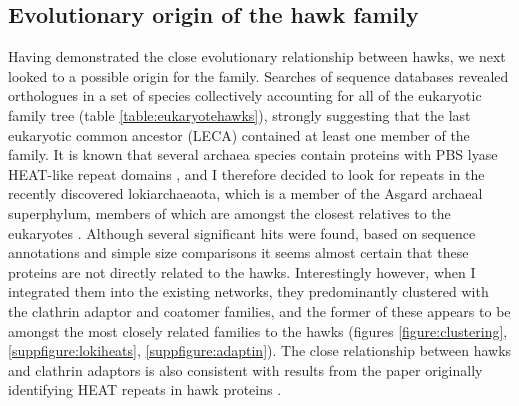 \documentclass[a4paper,11pt,twoside,openright]{scrbook}
\begin{document}
\subsection{Evolutionary origin of the hawk family}
Having demonstrated the close evolutionary relationship between hawks, we next
looked to a possible origin for the family. Searches of sequence databases
revealed orthologues in a set of species collectively accounting for all of the
eukaryotic family tree (table \ref{table:eukaryotehawks}), strongly suggesting
that the last eukaryotic common ancestor (LECA) contained at least one member of
the family. It is known that several archaea species contain proteins with PBS
lyase HEAT-like repeat domains \cite{Schlesner2009}, and I therefore decided to
look for repeats in the recently discovered lokiarchaeaota, which is a member of
the Asgard archaeal superphylum, members of which are amongst the closest
relatives to the eukaryotes \cite{Spang2015,Zaremba-Niedzwiedzka2017}. Although
several significant hits were found, based on sequence annotations and simple
size comparisons it seems almost certain that these proteins are not directly
related to the hawks. Interestingly however, when I integrated them into the
existing networks, they predominantly clustered with the clathrin adaptor and
coatomer families, and the former of these appears to be amongst the most
closely related families to the hawks (figures \ref{figure:clustering},
\ref{suppfigure:lokiheats}, \ref{suppfigure:adaptin}). The close relationship
between hawks and clathrin adaptors is also consistent with results from the
paper originally identifying HEAT repeats in hawk proteins \cite{Neuwald2000}.
\end{document}
